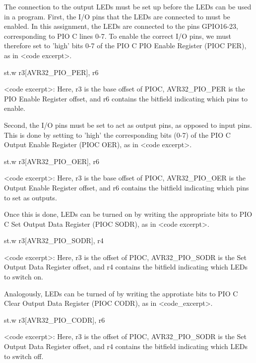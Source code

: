 The connection to the output LEDs must be set up before the LEDs can be used in a program.
First, the I/O pins that the LEDs are connected to must be enabled.
In this assignment, the LEDs are connected to the pins GPIO16-23, corresponding to PIO C lines 0-7.
To enable the correct I/O pins, we must therefore set to 'high' bits 0-7 of the PIO C PIO Enable Register (PIOC PER), as in <code excerpt>.

    st.w r3[AVR32_PIO_PER], r6

    <code excerpt>: Here, r3 is the base offset of PIOC, AVR32_PIO_PER is the PIO Enable Register offset, and r6 contains the bitfield indicating which pins to enable.


Second, the I/O pins must be set to act as output pins, as opposed to input pins.
This is done by setting to 'high' the corresponding bits (0-7) of the PIO C Output Enable Register (PIOC OER), as in <code excerpt>.

    st.w r3[AVR32_PIO_OER], r6

    <code excerpt>: Here, r3 is the base offset of PIOC, AVR32_PIO_OER is the Output Enable Register offset, and r6 contains the bitfield indicating which pins to set as outputs.


Once this is done, LEDs can be turned on by writing the appropriate bits to PIO C Set Output Data Register (PIOC SODR), as in <code excerpt>.

    st.w r3[AVR32_PIO_SODR], r4
    
    <code excerpt>: Here, r3 is the offset of PIOC, AVR32_PIO_SODR is the Set Output Data Register offset, and r4 contains the bitfield indicating which LEDs to switch on.

Analogously, LEDs can be turned of by writing the approtiate bits to PIO C Clear Output Data Register (PIOC CODR), as in <code_excerpt>.

    st.w r3[AVR32_PIO_CODR], r6

    <code excerpt>: Here, r3 is the offset of PIOC, AVR32_PIO_SODR is the Set Output Data Register offset, and r4 contains the bitfield indicating which LEDs to switch off.
